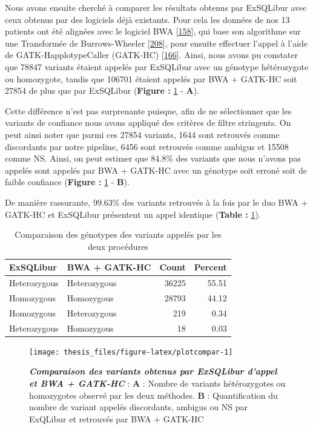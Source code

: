 \documentclass[12pt,a4paper,twoside]{ugathesis}
\theoremstyle{definition}
\theoremstyle{definition}
\theoremstyle{definition}
\theoremstyle{remark}
\begin{document}
\newpage

Nous avons ensuite cherché à comparer les résultats obtenus par
ExSQLibur avec ceux obtenus par des logiciels déjà existants. Pour cela
les données de nos 13 patients ont été alignées avec le logiciel BWA
{[}\protect\hyperlink{ref-Li2009b}{158}{]}, qui base son algorithme sur
une Transformée de Burrows-Wheeler
{[}\protect\hyperlink{ref-Burrows1994}{208}{]}, pour ensuite effectuer
l'appel à l'aide de GATK-HapplotypeCaller (GATK-HC)
{[}\protect\hyperlink{ref-McKenna2010}{166}{]}. Ainsi, nous avons pu
constater que 78847 variants étaient appelés par ExSQLibur avec un
génotype hétérozygote ou homozygote, tandis que 106701 étaient appelés
par BWA + GATK-HC soit 27854 de plus que par ExSQLibur (\textbf{Figure :
}\ref{fig:plotcompar} - \textbf{A}).

Cette différence n'est pas surprenante puisque, afin de ne sélectionner
que les variants de confiance nous avons appliqué des critères de filtre
stringents. On peut ainsi noter que parmi ces 27854 variants, 1644 sont
retrouvés comme discordants par notre pipeline, 6456 sont retrouvés
comme ambigus et 15508 comme NS. Ainsi, on peut estimer que 84.8\% des
variants que nous n'avons pas appelés sont appelés par BWA + GATK-HC
avec un génotype soit erroné soit de faible confiance (\textbf{Figure :
}\ref{fig:plotcompar} - \textbf{B}).

De manière rassurante, 99.63\% des variants retrouvés à la fois par le
duo BWA + GATK-HC et ExSQLibur présentent un appel identique
(\textbf{Table : }\ref{tab:tabcallcomp}).

\begin{longtable}[t]{llrr}
\caption{\label{tab:tabcallcomp}Comparaison des génotypes des variants appelés par les deux procédures}\\
\toprule
ExSQLibur & BWA + GATK-HC & Count & Percent\\
\midrule
Heterozygous & Heterozygous & 36225 & 55.51\\
Homozygous & Homozygous & 28793 & 44.12\\
Homozygous & Heterozygous & 219 & 0.34\\
Heterozygous & Homozygous & 18 & 0.03\\
\bottomrule
\end{longtable}

\newpage

\begin{figure}

{\centering \texttt{[image: thesis\_files/figure-latex/plotcompar-1]} 

}

\caption[Comparaison des variants obtenus par ExSQLibur d'appel et BWA + GATK-HC]{\textbf{\emph{Comparaison des variants obtenus par
ExSQLibur d'appel et BWA + GATK-HC}} : \textbf{A} : Nombre de variants
hétérozygotes ou homozygotes observé par les deux méthodes. \textbf{B} :
Quantification du nombre de variant appelés discordants, ambigus ou NS
par ExQLibur et retrouvés par BWA + GATK-HC}\label{fig:plotcompar}
\end{figure}
\end{document}
